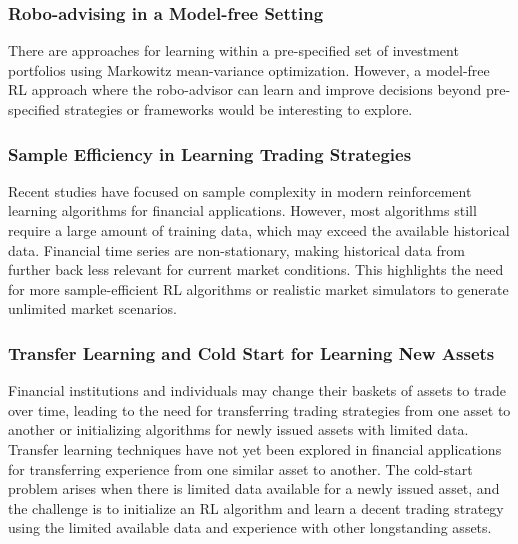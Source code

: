 \documentclass{article}
\begin{document}
\subsubsection{Robo-advising in a Model-free Setting}
There are approaches for learning within a pre-specified set of investment portfolios using Markowitz mean-variance optimization. However, a model-free RL approach where the robo-advisor can learn and improve decisions beyond pre-specified strategies or frameworks would be interesting to explore.

\subsubsection{Sample Efficiency in Learning Trading Strategies}
Recent studies have focused on sample complexity in modern reinforcement learning algorithms for financial applications. However, most algorithms still require a large amount of training data, which may exceed the available historical data. Financial time series are non-stationary, making historical data from further back less relevant for current market conditions. This highlights the need for more sample-efficient RL algorithms or realistic market simulators to generate unlimited market scenarios.

\subsubsection{Transfer Learning and Cold Start for Learning New Assets}
Financial institutions and individuals may change their baskets of assets to trade over time, leading to the need for transferring trading strategies from one asset to another or initializing algorithms for newly issued assets with limited data. Transfer learning techniques have not yet been explored in financial applications for transferring experience from one similar asset to another. The cold-start problem arises when there is limited data available for a newly issued asset, and the challenge is to initialize an RL algorithm and learn a decent trading strategy using the limited available data and experience with other longstanding assets.
\end{document}
